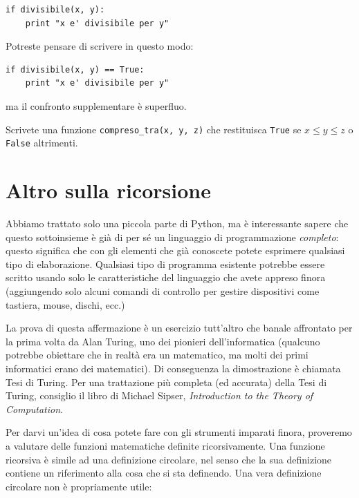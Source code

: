 \documentclass[10pt]{book}
\begin{document}
\begin{verbatim}
if divisibile(x, y):
    print "x e' divisibile per y"
\end{verbatim}
%
Potreste pensare di scrivere in questo modo:

\begin{verbatim}
if divisibile(x, y) == True:
    print "x e' divisibile per y"
\end{verbatim}
%
ma il confronto supplementare è superfluo.

\vspace{0.2in}
\begin{exercise}

Scrivete una funzione \verb"compreso_tra(x, y, z)" che restituisca {\tt True} se $x \le y \le z$ o {\tt False} altrimenti.

\end{exercise}


\section{Altro sulla ricorsione}
\label{more.recursion}

Abbiamo trattato solo una piccola parte di Python, ma è interessante sapere che questo sottoinsieme è già di per sé un linguaggio di programmazione {\em completo}: questo significa che con gli elementi che già conoscete potete esprimere qualsiasi tipo di elaborazione. Qualsiasi tipo di programma esistente potrebbe essere scritto usando solo le caratteristiche del linguaggio che avete appreso finora (aggiungendo solo alcuni comandi di controllo per gestire dispositivi come tastiera, mouse, dischi, ecc.)

La prova di questa affermazione è un esercizio tutt'altro che banale affrontato per la prima volta da Alan Turing, uno dei pionieri dell'informatica (qualcuno potrebbe obiettare che in realtà era un matematico, ma molti dei primi informatici erano dei matematici). Di conseguenza la dimostrazione è chiamata Tesi di Turing.
Per una trattazione più completa (ed accurata) della Tesi di Turing, consiglio il libro di Michael Sipser, {\em Introduction to the Theory of Computation}.

Per darvi un'idea di cosa potete fare con gli strumenti imparati finora, proveremo a valutare delle funzioni matematiche definite ricorsivamente. Una funzione ricorsiva è simile ad una definizione circolare, nel senso che la sua definizione contiene un riferimento alla cosa che si sta definendo. Una vera definizione circolare non è propriamente utile:
\end{document}
